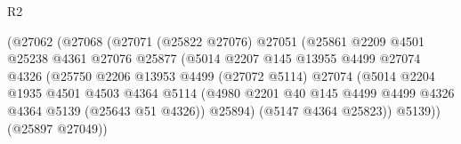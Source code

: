 \begin{lexlean}{R2}
\begin{coremodule}
                                      (@27062
                                        (@27068
                                          (@27071
                                            (@25822 @27076)
                                            @27051
                                            (@25861
                                              @2209
                                              @4501
                                              @25238
                                              @4361
                                              @27076
                                              @25877
                                              (@5014
                                                @2207
                                                @145
                                                @13955
                                                @4499
                                                @27074
                                                @4326
                                                (@25750
                                                  @2206
                                                  @13953
                                                  @4499
                                                  (@27072 @5114)
                                                  @27074
                                                  (@5014
                                                    @2204
                                                    @1935
                                                    @4501
                                                    @4503
                                                    @4364
                                                    @5114
                                                    (@4980
                                                      @2201
                                                      @40
                                                      @145
                                                      @4499
                                                      @4499
                                                      @4326
                                                      @4364
                                                      @5139
                                                      (@25643 @51 @4326))
                                                    @25894)
                                                  (@5147 @4364 @25823))
                                                @5139))
                                            (@25897 @27049))

\end{coremodule}
\end{lexlean}
